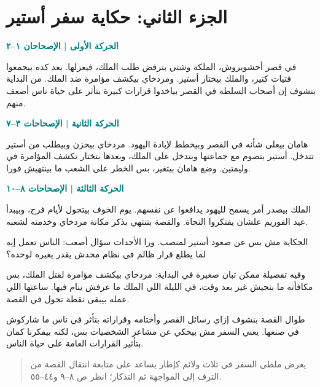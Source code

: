 \documentclass[12pt,a4paper]{article}
\begin{document}
\section*{الجزء الثاني: حكاية سفر أستير}
\noindent\textcolor{teal}{\textbf{الحركة الأولى | الإصحاحان ١–٢}}\par\smallskip
في قصر أحشويروش، الملكة وشتي بترفض طلب الملك، فيعزلها. بعد كده بيجمعوا فتيات كتير، والملك بيختار أستير. ومردخاي بيكشف مؤامرة ضد الملك. من البداية بنشوف إن أصحاب السلطة في القصر بياخدوا قرارات كبيرة بتأثر على حياة ناس أضعف منهم.\par\medskip
\noindent\textcolor{teal}{\textbf{الحركة الثانية | الإصحاحات ٣–٧}}\par\smallskip
هامان بيعلى شأنه في القصر وبيخطط لإبادة اليهود. مردخاي بيحزن وبيطلب من أستير تتدخل. أستير بتصوم مع جماعتها وبتدخل على الملك، وبعدها بتختار تكشف المؤامرة في وليمتين. وضع هامان بيتغير، بس الخطر على الشعب ما بينتهيش فورا.\par\medskip
\noindent\textcolor{teal}{\textbf{الحركة الثالثة | الإصحاحات ٨–١٠}}\par\smallskip
الملك بيصدر أمر يسمح لليهود يدافعوا عن نفسهم. يوم الخوف بيتحول لأيام فرح، وبيبدأ عيد الفوريم علشان يفتكروا النجاة. والقصة بتنتهي بذكر مكانة مردخاي وخدمته لشعبه.\par\medskip
الحكاية مش بس عن صعود أستير لمنصب. ورا الأحداث سؤال أصعب: الناس تعمل إيه لما يطلع قرار ظالم في نظام محدش يقدر يغيره لوحده؟\par\medskip
وفيه تفصيلة ممكن تبان صغيرة في البداية: مردخاي بيكشف مؤامرة لقتل الملك، بس مكافأته ما بتجيش غير بعد وقت، في الليلة اللي الملك ما عرفش ينام فيها. ساعتها اللي عمله بيبقى نقطة تحول في القصة.\par\medskip
طوال القصة بنشوف إزاي رسائل القصر وأختامه وقراراته بتأثر في ناس ما شاركوش في صنعها. يعني السفر مش بيحكي عن مشاعر الشخصيات بس، لكنه بيفكرنا كمان بتأثير القرارات العامة على حياة الناس.\par\medskip
\begin{quote}\small\color{muted}يعرض ملطي السفر في ثلاث ولائم كإطار يساعد على متابعة انتقال القصة من الترف إلى المواجهة ثم التذكار؛ انظر ص ٨–٩ و٤٤–٥٥.\end{quote}
\clearpage
\clearpage
\end{document}
